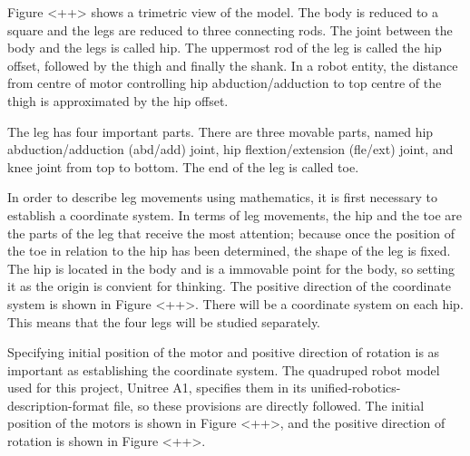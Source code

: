 Figure <++> shows a trimetric view of the model. The body is reduced to a square and the legs are reduced to three connecting rods. The joint between the body and the legs is called hip. The uppermost rod of the leg is called the hip offset, followed by the thigh and finally the shank. In a robot entity, the distance from centre of motor controlling hip abduction/adduction to top centre of the thigh is approximated by the hip offset.


The leg has four important parts. There are three movable parts, named hip abduction/adduction (abd/add) joint, hip flextion/extension (fle/ext) joint, and knee joint from top to bottom. The end of the leg is called toe.

In order to describe leg movements using mathematics, it is first necessary to establish a coordinate system. In terms of leg movements, the hip and the toe are the parts of the leg that receive the most attention; because once the position of the toe in relation to the hip has been determined, the shape of the leg is fixed. The hip is located in the body and is a immovable point for the body, so setting it as the origin is convient for thinking. The positive direction of the coordinate system is shown in Figure <++>. There will be a coordinate system on each hip. This means that the four legs will be studied separately.

Specifying initial position of the motor and positive direction of rotation is as important as establishing the coordinate system. The quadruped robot model used for this project, Unitree A1, specifies them in its unified-robotics-description-format file, so these provisions are directly followed. The initial position of the motors is shown in Figure <++>, and the positive direction of rotation is shown in Figure <++>.



